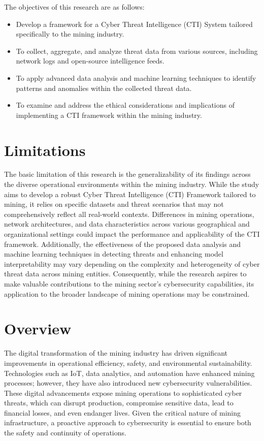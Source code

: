 \documentclass[a4paper,twoside,12pt]{report}
\begin{document}
The objectives of this research are as follows:

\begin{itemize}
    \item Develop a framework for a Cyber Threat Intelligence (CTI) System tailored specifically to the mining industry.
    \item To collect, aggregate, and analyze threat data from various sources, including network logs and open-source intelligence feeds.
    \item To apply advanced data analysis and machine learning techniques to identify patterns and anomalies within the collected threat data.
    \item To examine and address the ethical considerations and implications of implementing a CTI framework within the mining industry.
\end{itemize}
\section{Limitations}
The basic limitation of this research is the generalizability of its findings across the diverse operational environments within the mining industry. While the study aims to develop a robust Cyber Threat Intelligence (CTI) Framework tailored to mining, it relies on specific datasets and threat scenarios that may not comprehensively reflect all real-world contexts. Differences in mining operations, network architectures, and data characteristics across various geographical and organizational settings could impact the performance and applicability of the CTI framework. Additionally, the effectiveness of the proposed data analysis and machine learning techniques in detecting threats and enhancing model interpretability may vary depending on the complexity and heterogeneity of cyber threat data across mining entities. Consequently, while the research aspires to make valuable contributions to the mining sector's cybersecurity capabilities, its application to the broader landscape of mining operations may be constrained.\\
\section{Overview}

The digital transformation of the mining industry has driven significant improvements in operational efficiency, safety, and environmental sustainability. Technologies such as IoT, data analytics, and automation have enhanced mining processes; however, they have also introduced new cybersecurity vulnerabilities. These digital advancements expose mining operations to sophisticated cyber threats, which can disrupt production, compromise sensitive data, lead to financial losses, and even endanger lives. Given the critical nature of mining infrastructure, a proactive approach to cybersecurity is essential to ensure both the safety and continuity of operations.
\end{document}
